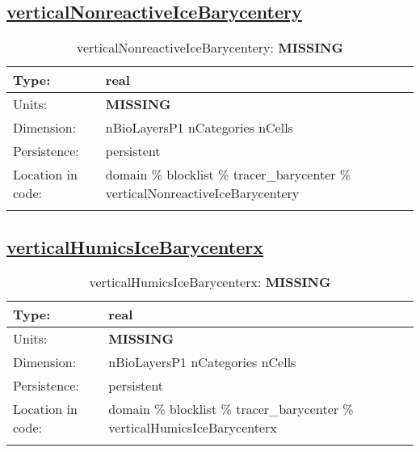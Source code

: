 \subsection[verticalNonreactiveIceBarycentery]{\hyperref[sec:var_tab_tracer_barycenter]{verticalNonreactiveIceBarycentery}}
\label{subsec:var_sec_tracer_barycenter_verticalNonreactiveIceBarycentery}
\begin{center}
\begin{longtable}{| p{2.0in} | p{4.0in} |}
        \hline 
        Type: & real \\
        \hline 
        Units: & {\bf \color{red} MISSING} \\
        \hline 
        Dimension: & nBioLayersP1 nCategories nCells \\
        \hline 
        Persistence: & persistent \\
        \hline 
         Location in code: & domain \% blocklist \% tracer\_barycenter \% verticalNonreactiveIceBarycentery \\
         \hline 
    \caption{verticalNonreactiveIceBarycentery: {\bf \color{red} MISSING}}
\end{longtable}
\end{center}
\subsection[verticalHumicsIceBarycenterx]{\hyperref[sec:var_tab_tracer_barycenter]{verticalHumicsIceBarycenterx}}
\label{subsec:var_sec_tracer_barycenter_verticalHumicsIceBarycenterx}
\begin{center}
\begin{longtable}{| p{2.0in} | p{4.0in} |}
        \hline 
        Type: & real \\
        \hline 
        Units: & {\bf \color{red} MISSING} \\
        \hline 
        Dimension: & nBioLayersP1 nCategories nCells \\
        \hline 
        Persistence: & persistent \\
        \hline 
         Location in code: & domain \% blocklist \% tracer\_barycenter \% verticalHumicsIceBarycenterx \\
         \hline 
    \caption{verticalHumicsIceBarycenterx: {\bf \color{red} MISSING}}
\end{longtable}
\end{center}
